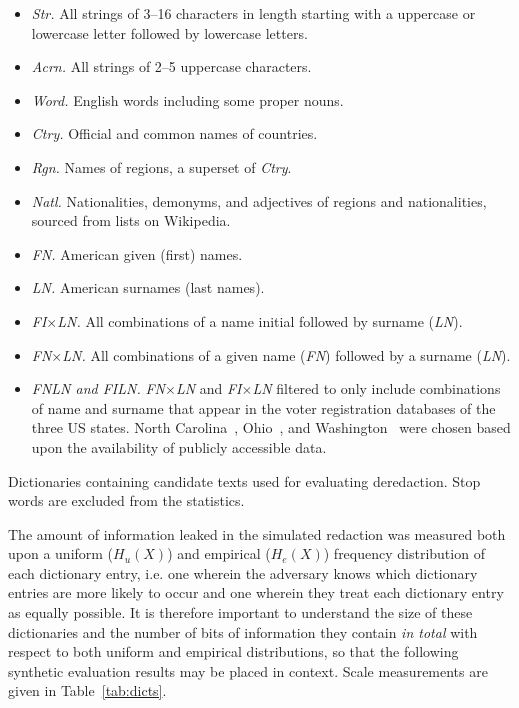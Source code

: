 \begin{itemize}[nosep]
\item\textit{Str.} All strings of 3--16 characters in length starting with a uppercase or lowercase letter followed by lowercase letters.
\item\textit{Acrn.} All strings of 2--5 uppercase characters.
\item\textit{Word.} English words including some proper nouns.
\item\textit{Ctry.} Official and common names of countries.
\item\textit{Rgn.} Names of regions, a superset of \emph{Ctry}.
\item\textit{Natl.} Nationalities, demonyms, and adjectives of regions and nationalities, sourced from lists on Wikipedia.
\item\textit{FN.} American given (first) names.
\item\textit{LN.} American surnames (last names).
\item\textit{FI$\times$LN.} All combinations of a name initial followed by surname (\emph{LN}).
\item\textit{FN$\times$LN.} All combinations of a given name (\emph{FN}) followed by a surname (\emph{LN}).
\item\textit{FNLN and FILN.} \emph{FN$\times$LN} and \emph{FI$\times$LN} filtered to only include combinations of name and surname that appear in the voter registration databases of the three US states.
    North Carolina~\cite{ncVoterData}, Ohio~\cite{ohVoterData}, and Washington~\cite{waVoterData} were chosen based upon the availability of publicly accessible data.
\end{itemize}

\begin{table}
\centering
\caption{
    Dictionaries containing candidate texts used for evaluating deredaction. 
    Stop words are excluded from the statistics.
}\label{tab:dicts}
\small
\end{table}

The amount of information leaked in the simulated redaction was measured both upon a uniform ($H_{u}(X)$) and empirical ($H_{e}(X)$) frequency distribution of each dictionary entry, i.e. one wherein the adversary knows which dictionary entries are more likely to occur and one wherein they treat each dictionary entry as equally possible.
It is therefore important to understand the size of these dictionaries and the number of bits of information they contain \emph{in total} with respect to both uniform and empirical distributions, so that the following synthetic evaluation results may be placed in context.
Scale measurements are given in Table~\ref{tab:dicts}.

